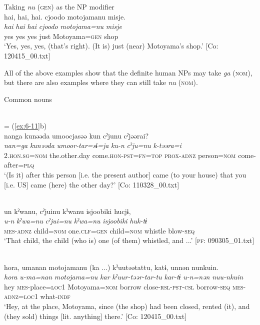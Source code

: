\ex Taking \textit{nu} (\textsc{gen}) as the NP modifier\\
{\TM}
\glll  {\textbar}hai,  hai,  hai{\textbar}.  cjoodo  motojamanu  misje.\\
\textit{hai}  \textit{hai}  \textit{hai}  \textit{cjoodo}  \textit{motojama=nu}  \textit{misje}\\
yes  yes  yes  just  Motoyama=\textsc{gen}  shop\\
\glt ‘Yes, yes, yes, (that’s right). (It is) just (near) Motoyama’s shop.’ [Co: 120415\_00.txt]
\z
\z

  All of the above examples show that the definite human NPs may take \textit{ga} (\textsc{nom}), but there are also examples where they can still take \textit{nu} (\textsc{nom}).

\ea\label{ex:6-135}
  Common nouns

 \ea{}\\
 = (\ref{ex:6-11}b)\\

{\TM}
\glll nanga  kunəəda  umoocjasəə  kun    cˀjunu  cˀjəərai?\\
      \textit{nan=ga}  \textit{kunəəda}  \textit{umoor-tar=sɨ=ja}  \textit{ku-n}   \textit{cˀju=nu}  \textit{k-təəra=i}\\
      2.\textsc{hon}.\textsc{sg}=\textsc{nom}  the.other.day  come.\textsc{hon}-\textsc{pst}=\textsc{fn}=\textsc{top}  \textsc{prox}-\textsc{adnz}      person=\textsc{nom}  come-after=\textsc{plq}\\
\glt ‘(Is it) after this person [i.e. the present author] came (to your house) that you [i.e. US] came (here) the other day?’ [Co: 110328\_00.txt]

\ex{}\\
{\TM}
\glll  un  kˀwanu,  cˀjuinu  kˀwanu  isjoobiki      hucjɨ,\\
\textit{u-n}  \textit{kˀwa=nu}  \textit{cˀjui=nu}  \textit{kˀwa=nu}  \textit{isjoobiki}   \textit{huk-tɨ}\\
\textsc{mes}-\textsc{adnz}  child=\textsc{nom}  one.\textsc{clf}=\textsc{gen}  child=\textsc{nom}  whistle  blow-\textsc{seq}\\
\glt ‘That child, the child (who is) one (of them) whistled, and ...’ [\textsc{pf}: 090305\_01.txt]

\ex{}\\
{\TM}
\glll  {\textbar}hora{\textbar},  umanan  motojamanu  (ka ...)  kˀuutəətattu,      katɨ,  unnən  nunkuin.\\
\textit{hora}  \textit{u-ma=nan}  \textit{motojama=nu}  \textit{kar}  \textit{kˀuur-təər-tar-tu}   \textit{kar-tɨ}  \textit{u-n=nən}  \textit{nuu-nkuin}\\
hey  \textsc{mes}-place=\textsc{loc1}  Motoyama=\textsc{nom}  borrow  close-\textsc{rsl}-\textsc{pst}-\textsc{csl}   borrow-\textsc{seq}  \textsc{mes}-\textsc{adnz}=\textsc{loc1}  what-\textsc{indf}\\
\glt ‘Hey, at the place, Motoyama, since (the shop) had been closed, rented (it), and (they sold) things [lit. anything] there.’ [Co: 120415\_00.txt]
\z
\z


